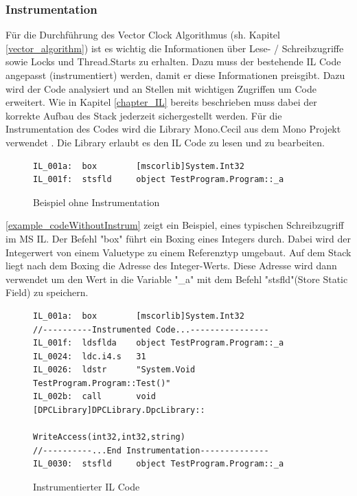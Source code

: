 \documentclass[10pt,a4paper]{article}
\begin{document}
\subsubsection{Instrumentation}
Für die Durchführung des Vector Clock Algorithmus (sh. Kapitel \ref{vector_algorithm}) ist es wichtig die Informationen über Lese- / Schreibzugriffe sowie Locks und Thread.Starts zu erhalten. Dazu muss der bestehende IL Code angepasst (instrumentiert) werden, damit er diese Informationen preisgibt. Dazu wird der Code analysiert und an Stellen mit wichtigen Zugriffen um Code erweitert. Wie in Kapitel \ref{chapter_IL} bereits beschrieben muss dabei der korrekte Aufbau des Stack jederzeit sichergestellt werden. Für die Instrumentation des Codes wird die Library Mono.Cecil aus dem Mono Projekt verwendet \cite{monocecil}. Die Library erlaubt es den IL Code zu lesen und zu bearbeiten. 
\begin{figure}[H]
\centering
\begin{lstlisting}[language=CIL,backgroundcolor=\color{backcolor}]
IL_001a:  box        [mscorlib]System.Int32
IL_001f:  stsfld     object TestProgram.Program::_a
\end{lstlisting}
\caption{Beispiel ohne Instrumentation}\label{example_codeWithoutInstrum}
\end{figure}
\autoref{example_codeWithoutInstrum} zeigt ein Beispiel, eines typischen Schreibzugriff im MS IL. Der Befehl "box" führt ein Boxing eines Integers durch. Dabei wird der Integerwert von einem Valuetype zu einem Referenztyp umgebaut. Auf dem Stack liegt nach dem Boxing die Adresse des Integer-Werts. Diese Adresse wird dann verwendet um den Wert in die Variable "\_a" mit dem Befehl "stsfld"(Store Static Field) zu speichern.\\
\begin{figure}[H]
\centering
\begin{lstlisting}[language=CIL,backgroundcolor=\color{backcolor}]
IL_001a:  box        [mscorlib]System.Int32
//----------Instrumented Code...----------------
IL_001f:  ldsflda    object TestProgram.Program::_a
IL_0024:  ldc.i4.s   31
IL_0026:  ldstr      "System.Void TestProgram.Program::Test()"
IL_002b:  call       void [DPCLibrary]DPCLibrary.DpcLibrary::
                                 WriteAccess(int32,int32,string)
//----------...End Instrumentation--------------
IL_0030:  stsfld     object TestProgram.Program::_a
\end{lstlisting}
\caption{Instrumentierter IL Code}\label{example_instrumentedCode}
\end{figure}
\end{document}
